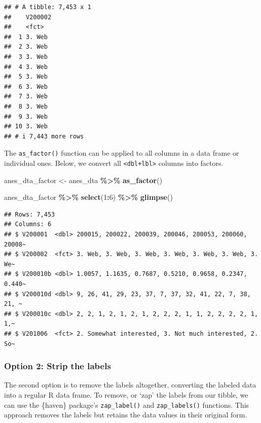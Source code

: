 \documentclass[
]{krantz}
\makeatletter
\newenvironment{Shaded}{\begin{snugshade}}{\end{snugshade}}
\newcommand{\DecValTok}[1]{\textcolor[rgb]{0.06,0.06,0.06}{#1}}
\newcommand{\FunctionTok}[1]{\textcolor[rgb]{0.27,0.27,0.27}{\textbf{#1}}}
\newcommand{\NormalTok}[1]{#1}
\newcommand{\OtherTok}[1]{\textcolor[rgb]{0.37,0.37,0.37}{#1}}
\newcommand{\SpecialCharTok}[1]{\textcolor[rgb]{0.43,0.43,0.43}{\textbf{#1}}}
\newenvironment{kframe}{%
\medskip{}
\setlength{\fboxsep}{.8em}
 \def\at@end@of@kframe{}%
 \ifinner\ifhmode%
  \def\at@end@of@kframe{\end{minipage}}%
  \begin{minipage}{\columnwidth}%
 \fi\fi%
 \def\FrameCommand##1{\hskip\@totalleftmargin \hskip-\fboxsep
 \colorbox{shadecolor}{##1}\hskip-\fboxsep
     \hskip-\linewidth \hskip-\@totalleftmargin \hskip\columnwidth}%
 \MakeFramed {\advance\hsize-\width
   \@totalleftmargin\z@ \linewidth\hsize
   \@setminipage}}%
 {\par\unskip\endMakeFramed%
 \at@end@of@kframe}
\renewenvironment{Shaded}{\begin{kframe}}{\end{kframe}}
\makeatother
\begin{document}
\begin{verbatim}
## # A tibble: 7,453 x 1
##    V200002
##    <fct>  
##  1 3. Web 
##  2 3. Web 
##  3 3. Web 
##  4 3. Web 
##  5 3. Web 
##  6 3. Web 
##  7 3. Web 
##  8 3. Web 
##  9 3. Web 
## 10 3. Web 
## # i 7,443 more rows
\end{verbatim}

The \texttt{as\_factor()} function can be applied to all columns in a data frame or individual ones. Below, we convert all \texttt{\textless{}dbl+lbl\textgreater{}} columns into factors.

\begin{Shaded}
\begin{Highlighting}[]
\NormalTok{anes\_dta\_factor }\OtherTok{\textless{}{-}}
\NormalTok{  anes\_dta }\SpecialCharTok{\%\textgreater{}\%}
  \FunctionTok{as\_factor}\NormalTok{()}

\NormalTok{anes\_dta\_factor }\SpecialCharTok{\%\textgreater{}\%}
  \FunctionTok{select}\NormalTok{(}\DecValTok{1}\SpecialCharTok{:}\DecValTok{6}\NormalTok{) }\SpecialCharTok{\%\textgreater{}\%}
  \FunctionTok{glimpse}\NormalTok{()}
\end{Highlighting}
\end{Shaded}

\begin{verbatim}
## Rows: 7,453
## Columns: 6
## $ V200001  <dbl> 200015, 200022, 200039, 200046, 200053, 200060, 20008~
## $ V200002  <fct> 3. Web, 3. Web, 3. Web, 3. Web, 3. Web, 3. Web, 3. We~
## $ V200010b <dbl> 1.0057, 1.1635, 0.7687, 0.5210, 0.9658, 0.2347, 0.440~
## $ V200010d <dbl> 9, 26, 41, 29, 23, 37, 7, 37, 32, 41, 22, 7, 38, 21, ~
## $ V200010c <dbl> 2, 2, 1, 2, 1, 2, 1, 2, 2, 2, 1, 1, 2, 2, 2, 2, 1, 1,~
## $ V201006  <fct> 2. Somewhat interested, 3. Not much interested, 2. So~
\end{verbatim}

\hypertarget{option-2-strip-the-labels}{%
\subsubsection*{Option 2: Strip the labels}\label{option-2-strip-the-labels}}


The second option is to remove the labels altogether, converting the labeled data into a regular R data frame. To remove, or `zap' the labels from our tibble, we can use the \{haven\} package's \texttt{zap\_label()} and \texttt{zap\_labels()} functions. This approach removes the labels but retains the data values in their original form.
\end{document}
